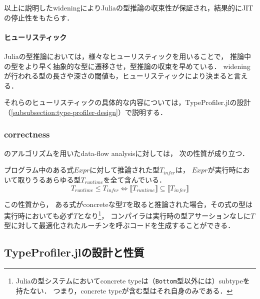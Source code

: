 以上に説明したwideningによりJuliaの型推論の収束性が保証され，結果的にJITの停止性をもたらす．

\paragraph{ヒューリスティック} \label{paragraph:inference-heuristic}

Juliaの型推論においては，様々なヒューリスティックを用いることで，
推論中の型をより早く抽象的な型に遷移させ，型推論の収束を早めている．
wideningが行われる型の長さや深さの閾値も，ヒューリスティックにより決まると言える．

それらのヒューリスティックの具体的な内容については，TypeProfiler.jlの設計（\ref{subsubsection:type-profiler-design}）で説明する．

\subsubsection{correctness} \label{subsubsection:inference-correctness}

\cite{graph-free-data-flow-analysis}のアルゴリズムを用いたdata-flow analysisに対しては，
次の性質が成り立つ\cite{jeff-master}．


\begin{theorem*}[correctness]
  \label{theorem:inference-correctness}
  プログラム中のある式\(Expr\)に対して推論された型\(T_{infer}\)は，
  \(Expr\)が実行時において取りうるあらゆる型\(T_{runtime}\)を全て含んでいる．
  \[
    T_{runtime} \leq T_{infer} \Leftrightarrow \llbracket T_{runtime} \rrbracket \subseteq \llbracket T_{infer} \rrbracket
  \]
\end{theorem*}

この性質から，
ある式がconcreteな型\(T\)を取ると推論された場合，その式の型は実行時においても必ず\(T\)となり\footnote{
  Juliaの型システムにおいてconcrete typeは（\texttt{Bottom}型以外には）subtypeを持たない．
  つまり，concrete typeが含む型はそれ自身のみである．
}，
コンパイラは実行時の型アサーションなしに\(T\)型に対して最適化されたルーチンを呼ぶコードを生成することができる．

\subsection{TypeProfiler.jlの設計と性質} \label{subsection:type-profiler-design-and-property}

